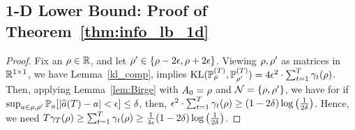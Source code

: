 \subsection{1-D Lower Bound: Proof of Theorem~\ref{thm:info_lb_1d}}
\begin{proof} Fix an $\rho \in \mathbb{R}$, and let $\rho' \in \{\rho - 2\epsilon, \rho + 2\epsilon\}$. Viewing $\rho,\rho'$ as matrices in $\mathbb{R}^{1 \times 1}$, we have Lemma~\ref{kl_comp}, implies $\mathrm{KL}(\mathbb{P}_{\rho}^{(T)},\mathbb{P}_{\rho'}^{(T)}) = 4\epsilon^2 \cdot \sum_{t=1}^T \gamma_{t}(\rho)$. Then, applying Lemma~\ref{lem:Birge} with $A_0 = \rho$ and $\mathcal{N} = \{\rho,\rho'\}$, we have for if $\sup_{a \in \rho,\rho'}\mathbb{P}_a[|\widehat{a}(T) - a| < \epsilon ] \le \delta$, then, $\epsilon^2 \cdot \sum_{t=1}^T \gamma_{t}(\rho) \ge (1-2\delta) \log\left(\frac{1}{2\delta}\right)$. Hence, we need $T\gamma_T(\rho) \ge\sum_{t = 1}^T\gamma_t(\rho) \ge \frac{1}{4\epsilon}(1-2\delta) \log\left(\frac{1}{2\delta}\right)$.
\end{proof}
